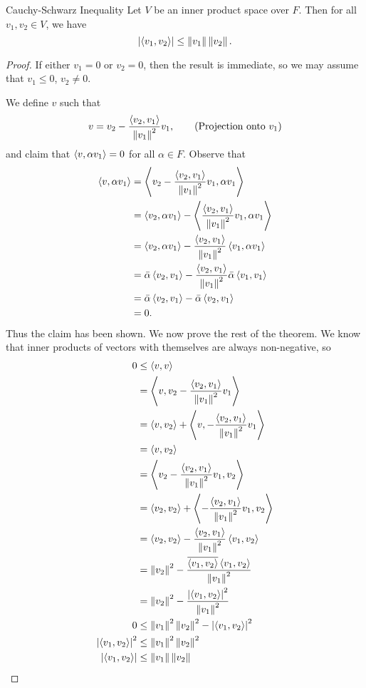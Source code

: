 \documentclass[class=article, crop=false]{standalone}
\begin{document}
  \begin{theorem}{Cauchy-Schwarz Inequality}
    Let $V$ be an inner product space over $F$. Then for all $v_1, v_2\in V$, we have
    \[
      \abs{\tup{v_1, v_2}} \leq \norm{v_1}\norm{v_2}.
    \]
  \end{theorem}
  \begin{proof}
    If either $v_1 = 0$ or $v_2 = 0$, then the result is immediate, so we may assume that $v_1\leq 0$, $v_2\neq 0$. \par
    We define $v$ such that
    \[
      v = v_2 - \frac{\tup{v_2, v_1}}{\norm{v_1}^2}v_1, \tag{Projection onto $v_1$}
    \]
    and claim that $\tup{v, \alpha v_1} = 0$ for all $\alpha\in F$. Observe that
    \begin{align*}
      \tup{v, \alpha v_1} &= \tup{v_2 - \frac{\tup{v_2, v_1}}{\norm{v_1}^2}v_1, \alpha v_1} \\
                          &= \tup{v_2, \alpha v_1} - \tup{\frac{\tup{v_2, v_1}}{\norm{v_1}^2}v_1, \alpha v_1} \\
                          &= \tup{v_2, \alpha v_1} - \frac{\tup{v_2, v_1}}{\norm{v_1}^2}\tup{v_1, \alpha v_1} \\
                          &= \bar{\alpha}\tup{v_2, v_1} - \frac{\tup{v_2, v_1}}{\norm{v_1}^2}\bar{\alpha}\tup{v_1, v_1} \\
                          &= \bar{\alpha}\tup{v_2, v_1} - \bar{\alpha}\tup{v_2, v_1} \\
                          &= 0.
    \end{align*}
    Thus the claim has been shown. We now prove the rest of the theorem. We know that inner products of vectors with themselves are always non-negative, so
    \begin{align*}
      0 &\leq \tup{v, v} \\
        &= \tup{v, v_2 - \frac{\tup{v_2, v_1}}{\norm{v_1}^2}v_1} \\
        &= \tup{v, v_2} + \tup{v, -\frac{\tup{v_2, v_1}}{\norm{v_1}^2}v_1} \\
        &= \tup{v, v_2} \\
        &= \tup{v_2 - \frac{\tup{v_2, v_1}}{\norm{v_1}^2}v_1, v_2} \\
        &= \tup{v_2, v_2} + \tup{-\frac{\tup{v_2, v_1}}{\norm{v_1}^2}v_1, v_2} \\
        &= \tup{v_2, v_2} - \frac{\tup{v_2, v_1}}{\norm{v_1}^2}\tup{v_1, v_2} \\
        &= \norm{v_2}^2 - \frac{\overline{\tup{v_1, v_2}}\tup{v_1, v_2}}{\norm{v_1}^2} \\
        &= \norm{v_2}^2 - \frac{\abs{\tup{v_1, v_2}}^2}{\norm{v_1}^2}\\
      0 &\leq \norm{v_1}^2\norm{v_2}^2 - \abs{\tup{v_1, v_2}}^2 \\
      \abs{\tup{v_1, v_2}}^2 &\leq \norm{v_1}^2\norm{v_2}^2 \\
      \abs{\tup{v_1, v_2}} &\leq \norm{v_1}\norm{v_2}
    \end{align*}
  \end{proof}
\end{document}
